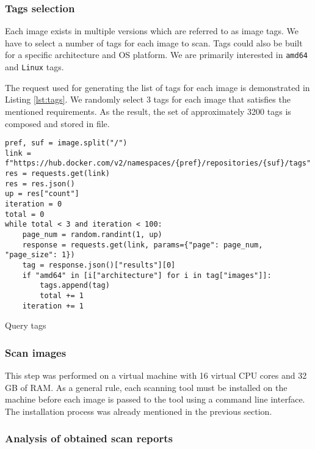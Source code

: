 \subsubsection{Tags selection}

Each image exists in multiple versions which are referred to as image tags. We have to select a number of tags for each image to scan. Tags could also be built for a specific architecture and OS platform. We are primarily interested in \texttt{amd64} and \texttt{Linux} tags. 

The request used for generating the list of tags for each image is demonstrated in Listing \ref{lst:tags}. We randomly select 3 tags for each image that satisfies the mentioned requirements. As the result, the set of approximately 3200 tags is composed and stored in file.

\begin{listing}[htp]
    \centering
    \begin{minipage}{1\linewidth}
        \begin{verbatim}
pref, suf = image.split("/")
link = f"https://hub.docker.com/v2/namespaces/{pref}/repositories/{suf}/tags"
res = requests.get(link)
res = res.json()
up = res["count"]
iteration = 0
total = 0
while total < 3 and iteration < 100:
    page_num = random.randint(1, up)
    response = requests.get(link, params={"page": page_num, "page_size": 1})
    tag = response.json()["results"][0]
    if "amd64" in [i["architecture"] for i in tag["images"]]:
        tags.append(tag)
        total += 1
    iteration += 1
        \end{verbatim}
    \end{minipage}
    \caption{Query tags}
    \label{lst:tags}
\end{listing}

\subsubsection{Scan images}

This step was performed on a virtual machine with 16 virtual CPU cores and 32 GB of RAM. As a general rule, each scanning tool must be installed on the machine before each image is passed to the tool using a command line interface. The installation process was already mentioned in the previous section.

\subsubsection{Analysis of obtained scan reports}

